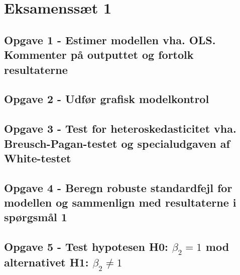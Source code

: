 \documentclass[
]{article}
\author{}
\date{\vspace{-2.5em}}
\begin{document}
\hypertarget{eksamenssuxe6t-1}{%
\section{Eksamenssæt 1}\label{eksamenssuxe6t-1}}

\hypertarget{opgave-1---estimer-modellen-vha.-ols.-kommenter-puxe5-outputtet-og-fortolk-resultaterne}{%
\subsection{Opgave 1 - Estimer modellen vha. OLS. Kommenter på outputtet
og fortolk
resultaterne}\label{opgave-1---estimer-modellen-vha.-ols.-kommenter-puxe5-outputtet-og-fortolk-resultaterne}}

\hypertarget{opgave-2---udfuxf8r-grafisk-modelkontrol}{%
\subsection{Opgave 2 - Udfør grafisk
modelkontrol}\label{opgave-2---udfuxf8r-grafisk-modelkontrol}}

\hypertarget{opgave-3---test-for-heteroskedasticitet-vha.-breusch-pagan-testet-og-specialudgaven-af-white-testet}{%
\subsection{Opgave 3 - Test for heteroskedasticitet vha.
Breusch-Pagan-testet og specialudgaven af
White-testet}\label{opgave-3---test-for-heteroskedasticitet-vha.-breusch-pagan-testet-og-specialudgaven-af-white-testet}}

\hypertarget{opgave-4---beregn-robuste-standardfejl-for-modellen-og-sammenlign-med-resultaterne-i-spuxf8rgsmuxe5l-1}{%
\subsection{Opgave 4 - Beregn robuste standardfejl for modellen og
sammenlign med resultaterne i spørgsmål
1}\label{opgave-4---beregn-robuste-standardfejl-for-modellen-og-sammenlign-med-resultaterne-i-spuxf8rgsmuxe5l-1}}

\hypertarget{opgave-5---test-hypotesen-h0-beta_2-1-mod-alternativet-h1-beta_2-neq-1}{%
\subsection{\texorpdfstring{Opgave 5 - Test hypotesen H0:
\(\beta_2 = 1\) mod alternativet H1:
\(\beta_2 \neq 1\)}{Opgave 5 - Test hypotesen H0: \textbackslash beta\_2 = 1 mod alternativet H1: \textbackslash beta\_2 \textbackslash neq 1}}\label{opgave-5---test-hypotesen-h0-beta_2-1-mod-alternativet-h1-beta_2-neq-1}}
\end{document}
